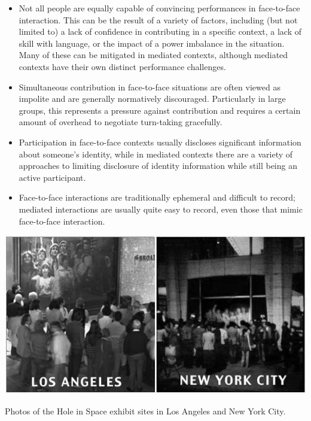 \begin{itemize}
\item Not all people are equally capable of convincing performances in face-to-face interaction. This can be the result of a variety of factors, including (but not limited to) a lack of confidence in contributing in a specific context, a lack of skill with language, or the impact of a power imbalance in the situation. Many of these can be mitigated in mediated contexts\citep{Siegel:1986ve}, although mediated contexts have their own distinct performance challenges.
\item Simultaneous contribution in face-to-face situations are often viewed as impolite and are generally normatively discouraged. Particularly in large groups, this represents a pressure against contribution and requires a certain amount of overhead to negotiate turn-taking gracefully.
\item Participation in face-to-face contexts usually discloses significant information about someone's identity, while in mediated contexts there are a variety of approaches to limiting disclosure of identity information while still being an active participant.
\item Face-to-face interactions are traditionally ephemeral and difficult to record; mediated interactions are usually quite easy to record, even those that mimic face-to-face interaction. 
\end{itemize}


\begin{marginfigure}
	\includegraphics{figures/hole_in_space.jpg}
	\caption{Photos of the Hole in Space exhibit sites in Los Angeles and New York City.}
	\label{fig:hole-in-space}
\end{marginfigure}

